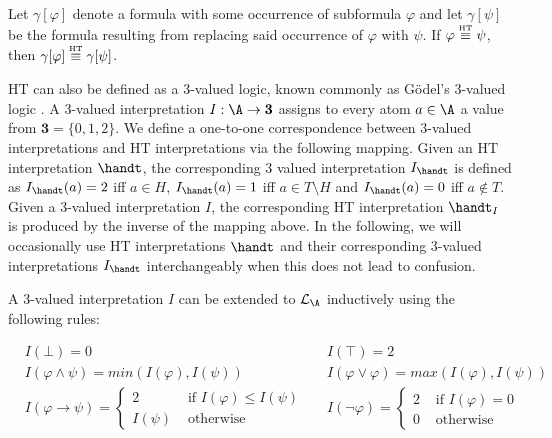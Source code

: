 \begin{proposition}
  Let $\gamma[\varphi]$ denote a formula with some occurrence of
  subformula $\varphi$ and let $\gamma[\psi]$ be the formula resulting
  from replacing said occurrence of $\varphi$ with $\psi$. If
  $\varphi \stackrel{\normalfont\mbox{\tiny HT}}{\equiv} \psi$, then $\gamma[\varphi] \stackrel{\normalfont\mbox{\tiny HT}}{\equiv} \gamma[\psi]$.
\end{proposition}

HT can also be defined as a 3-valued logic, known commonly as Gödel's
3-valued logic \cite{capeva05a}. A 3-valued interpretation
$I: \A \rightarrow \textbf{3}$ assigns to every atom $a\in \A$ a value
from $\textbf{3}=\{ 0, 1, 2 \}$. We define a one-to-one correspondence
between 3-valued interpretations and HT interpretations via the
following mapping. Given an HT interpretation $\handt$, the
corresponding 3 valued interpretation $I_{\handt}$ is defined as
$I_{\handt}(a)=2$ iff $a \in H$, $I_{\handt}(a)=1$ iff
$a \in T \setminus H$ and $I_{\handt}(a)=0$ iff $a \not\in T$. Given a
3-valued interpretation $I$, the corresponding HT interpretation
$\handt_{I}$ is produced by the inverse of the mapping above. In the
following, we will occasionally use HT interpretations $\handt$ and
their corresponding 3-valued interpretations $I_{\handt}$
interchangeably when this does not lead to confusion.

A 3-valued interpretation $I$ can be extended to $\langa$
inductively using the following rules:
\begin{definition}\label{def:3-valued-extension}
  \begin{align*}
    &I(\bot) = 0
    &&I(\top) = 2 \\
    &I(\varphi \wedge \psi) = min(I(\varphi),I(\psi))
    &&I(\varphi \vee \varphi) = max(I(\varphi),I(\psi)) \\
    &I(\varphi \rightarrow \psi) =
      \begin{cases}
        2 & \text { if } I(\varphi) \leq I(\psi) \\
        I(\psi) & \text { otherwise }
      \end{cases}
    &&I(\neg \varphi) = \begin{cases}2
      & \text { if } I(\varphi)=0 \\
      0 & \text { otherwise }\end{cases}
  \end{align*}
\end{definition}

